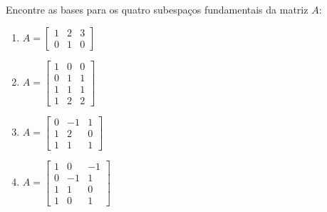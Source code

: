 \begin{question}
  Encontre as bases para os quatro subespaços fundamentais  da matriz $A$:
  \begin{multicols}{2}
    \begin{enumerate}[label=\alph*)]
      \item $A = \begin{bmatrix}
                1 & 2 & 3 \\ 0 & 1 & 0
              \end{bmatrix}$
      \item $A = \begin{bmatrix}
                1 & 0 & 0 \\ 0 & 1 & 1 \\ 1 & 1 & 1 \\ 1 & 2 & 2
              \end{bmatrix}$
      \item $A = \begin{bmatrix}
                0 & -1 & 1 \\ 1 & 2 & 0 \\ 1 & 1 & 1
              \end{bmatrix}$
      \item $A = \begin{bmatrix}
                1 & 0 & -1 \\ 0 & -1 & 1 \\ 1 & 1 & 0 \\ 1 & 0 & 1
              \end{bmatrix}$
    \end{enumerate}
  \end{multicols}
\end{question}

